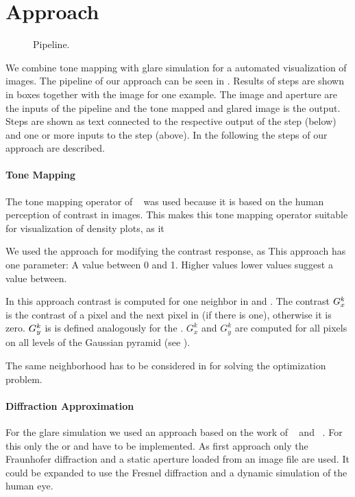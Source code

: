 
\section{Approach} %
\begin{figure}
	\centering
	
	\caption{Pipeline.}
	\label{fig:pipeline}
\end{figure}

We combine tone mapping with glare simulation for a automated visualization of images.
The pipeline of our approach can be seen in .
Results of steps are shown in boxes together with the image for one example.
The image \image{} and aperture \aperture{} are the inputs of the pipeline and the tone mapped and glared image \finalimage{} is the output.
Steps are shown as text connected to the respective output of the step (below) and one or more inputs to the step (above).
In the following the steps of our approach are described.

\paragraph{Tone Mapping}
The tone mapping operator of \citeauthor{Mantiuk2006}~\cite{Mantiuk2006} was used because it is based on the human perception of contrast in images.
This makes this tone mapping operator suitable for visualization of density plots, as it %

We used the  approach for modifying the contrast response, as %
This approach has one parameter: A value between 0 and 1.
Higher values %
lower values %
 suggest a value between.

In this approach contrast is computed for one neighbor in \xdir{} and \ydirection{}.
The contrast $G_x^k$ is the contrast of a pixel and the next pixel in \xdirection{} (if there is one),
otherwise it is zero.
$G_y^k$ is is defined analogously for the \ydirection{}.
$G_x^k$ and $G_y^k$ are computed for all pixels on all levels of the Gaussian pyramid (see ).

The same neighborhood has to be considered in  for solving the optimization problem.

\paragraph{Diffraction Approximation}
For the glare simulation we used an approach based on the work of \citeauthor{Kakimoto2004}~\cite{Kakimoto2004} and \citeauthor{Ritschel2009}~\cite{Ritschel2009}.
For this only the  or  and  have to be implemented.
As first approach only the Fraunhofer diffraction and a static aperture loaded from an image file are used.
It could be expanded to use the Fresnel diffraction and a dynamic simulation of the human eye.

